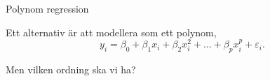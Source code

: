 \documentclass[10pt,english]{beamer}
\begin{document}
\begin{frame}{Polynom regression}

    Ett alternativ är att modellera som ett polynom,
    \begin{equation*}
        y_i = \beta_0 + \beta_1 x_i + \beta_2 x_i^2 + \ldots + \beta_p x_i^p + \varepsilon_i.
    \end{equation*}

    Men vilken ordning ska vi ha?

    
\end{frame}

    
\end{document}
